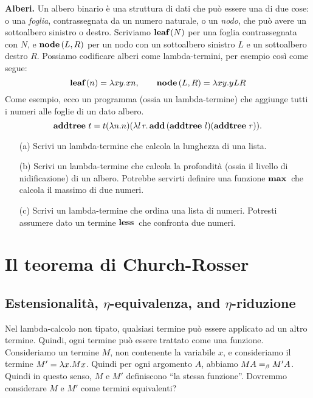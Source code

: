 \documentclass{article}
\begin{document}
{\bf Alberi.} Un albero binario \`e una struttura di dati che pu\`o essere una
di due cose: o una {\em foglia}, contrassegnata da un numero naturale, o un {\em
	nodo}, che pu\`o avere un sottoalbero sinistro o destro. Scriviamo $\mathop{\textbf{\bf leaf}\,}(N)$
per una foglia contrassegnata con $N$, e $\mathop{\textbf{\bf node}\,}(L,R)$ per un nodo con un
sottoalbero sinistro $L$ e un sottoalbero destro $R$. Possiamo codificare
alberi come lambda-termini, per esempio cos\`i come segue:
\[ \mathop{\textbf{\bf leaf}\,}(n) = \lambda xy.xn,\hspace{2em} \mathop{\textbf{\bf node}\,}(L,R) = \lambda xy.yLR \]
Come esempio, ecco un programma (ossia un lambda-termine) che aggiunge
tutti i numeri alle foglie di un dato albero.
\[ \mathop{\textbf{\bf addtree}\,} t = t(\lambda n.n)(\lambda l\,
r.\mathop{\textbf{\bf add}\,}(\mathop{\textbf{\bf addtree}\,}l)(\mathop{\textbf{\bf addtree}\,}r)).
\]

\begin{exercise}
  \begin{enumerate}
  \item[(a)] Scrivi un lambda-termine che calcola la lunghezza di una lista.
  \item[(b)] Scrivi un lambda-termine che calcola la profondit\`a (ossia il
  livello di nidificazione) di un albero. Potrebbe servirti definire una
    funzione $\mathop{\textbf{\bf max}\,}$ che calcola il massimo di due numeri.
  \item[(c)] Scrivi un lambda-termine che ordina una lista di numeri. Potresti
  assumere dato un termine $\mathop{\textbf{\bf less}\,}$ che confronta due numeri.
  \end{enumerate}
\end{exercise}

\section{Il teorema di Church-Rosser}

\subsection{Estensionalit\`a, $\eta$-equivalenza, and $\eta$-riduzione}

Nel lambda-calcolo non tipato, qualsiasi termine pu\`o essere applicato
ad un altro termine. Quindi, ogni termine pu\`o essere trattato come una funzione.
Consideriamo un termine $M$, non contenente la variabile $x$, e consideriamo
il termine $M'=\lambda x.Mx$. Quindi per ogni argomento $A$, abbiamo $MA=_{\beta} M'A$.
Quindi in questo senso, $M$ e $M'$ definiscono ``la stessa funzione''.  
Dovremmo considerare $M$ e $M'$ come termini equivalenti?
\end{document}
